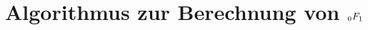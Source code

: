 %
%
%
%



\chapter{Algorithmus zur Berechnung von $\mathstrut_0F_1$\label{chapter:0f1}}
\begin{refsection}









\printbibliography[heading=subbibliography]
\end{refsection}

